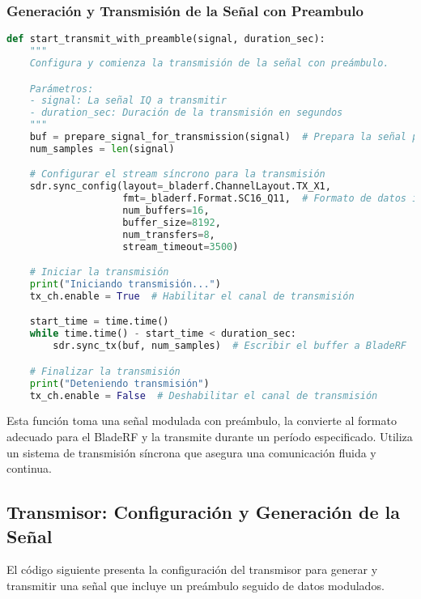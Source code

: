 \documentclass[letterpaper,12pt,oneside]{article}
\begin{document}
\subsubsection*{Generación y Transmisión de la Señal con Preambulo}
\begin{tcolorbox}[title=\textbf{Función para Transmitir la Señal con Preambulo}, colframe=black, colback=white]
\begin{lstlisting}[language=Python]
def start_transmit_with_preamble(signal, duration_sec):
    """
    Configura y comienza la transmisión de la señal con preámbulo.

    Parámetros:
    - signal: La señal IQ a transmitir
    - duration_sec: Duración de la transmisión en segundos
    """
    buf = prepare_signal_for_transmission(signal)  # Prepara la señal para transmisión
    num_samples = len(signal)

    # Configurar el stream síncrono para la transmisión
    sdr.sync_config(layout=_bladerf.ChannelLayout.TX_X1,
                    fmt=_bladerf.Format.SC16_Q11,  # Formato de datos int16
                    num_buffers=16,
                    buffer_size=8192,
                    num_transfers=8,
                    stream_timeout=3500)

    # Iniciar la transmisión
    print("Iniciando transmisión...")
    tx_ch.enable = True  # Habilitar el canal de transmisión

    start_time = time.time()
    while time.time() - start_time < duration_sec:
        sdr.sync_tx(buf, num_samples)  # Escribir el buffer a BladeRF

    # Finalizar la transmisión
    print("Deteniendo transmisión")
    tx_ch.enable = False  # Deshabilitar el canal de transmisión
\end{lstlisting}
\end{tcolorbox}

Esta función toma una señal modulada con preámbulo, la convierte al formato adecuado para el BladeRF y la transmite durante un período especificado. Utiliza un sistema de transmisión síncrona que asegura una comunicación fluida y continua.

\subsection{Transmisor: Configuración y Generación de la Señal}

El código siguiente presenta la configuración del transmisor para generar y transmitir una señal que incluye un preámbulo seguido de datos modulados.
\end{document}
